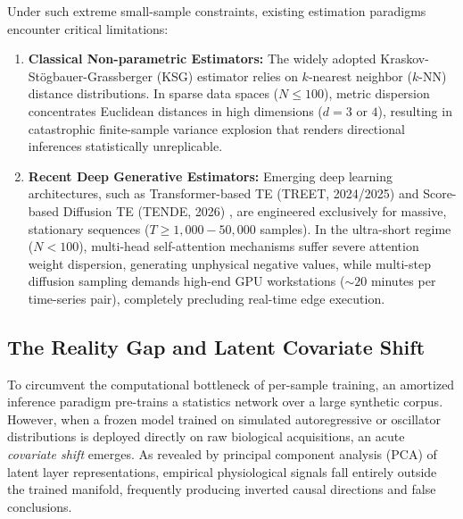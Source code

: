 Under such extreme small-sample constraints, existing estimation paradigms encounter critical limitations:
\begin{enumerate}
    \item \textbf{Classical Non-parametric Estimators:} The widely adopted Kraskov-St{\"o}gbauer-Grassberger (KSG) estimator \cite{kraskov2004estimating} relies on $k$-nearest neighbor ($k$-NN) distance distributions. In sparse data spaces ($N \le 100$), metric dispersion concentrates Euclidean distances in high dimensions ($d = 3$ or $4$), resulting in catastrophic finite-sample variance explosion that renders directional inferences statistically unreplicable.
    \item \textbf{Recent Deep Generative Estimators:} Emerging deep learning architectures, such as Transformer-based TE (TREET, 2024/2025) \cite{treet2024} and Score-based Diffusion TE (TENDE, 2026) \cite{tende2025}, are engineered exclusively for massive, stationary sequences ($T \ge 1,000 - 50,000$ samples). In the ultra-short regime ($N < 100$), multi-head self-attention mechanisms suffer severe attention weight dispersion, generating unphysical negative values, while multi-step diffusion sampling demands high-end GPU workstations ($\sim 20$ minutes per time-series pair), completely precluding real-time edge execution.
\end{enumerate}

\subsection{The Reality Gap and Latent Covariate Shift}
To circumvent the computational bottleneck of per-sample training, an amortized inference paradigm pre-trains a statistics network over a large synthetic corpus. However, when a frozen model trained on simulated autoregressive or oscillator distributions is deployed directly on raw biological acquisitions, an acute \emph{covariate shift} emerges. As revealed by principal component analysis (PCA) of latent layer representations, empirical physiological signals fall entirely outside the trained manifold, frequently producing inverted causal directions and false conclusions.

